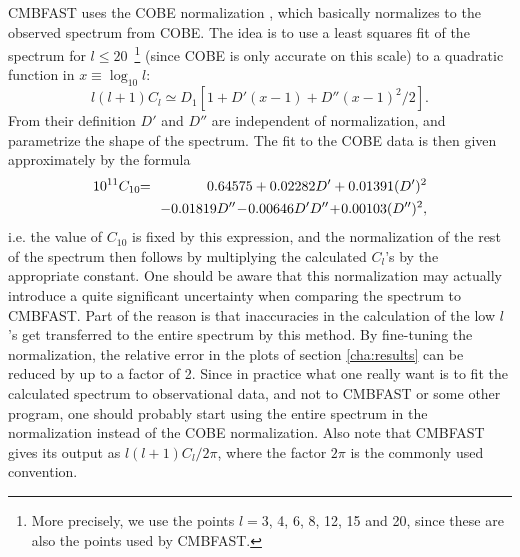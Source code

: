 \documentclass[twocolumn,nofootinbib,amsmath,amssymb]{revtex4}
\newcommand{\be}{\begin{equation}}
\newcommand{\ee}{\end{equation}}
\newcommand{\ba}{\begin{eqnarray}}
\newcommand{\ea}{\end{eqnarray}}
\newcommand{\hs}{\hspace{-1.12mm}}
\newcommand{\eq}{\hs & = & \hs}
\newcommand{\eqnl}{\hs & & \hs}
\begin{document}
CMBFAST uses the COBE normalization \cite{Bunn_White}, which basically
normalizes to the observed spectrum from COBE. The idea is to use a least
squares fit of the spectrum for $l \leq 20$~\footnote{More precisely, we use
the points $l = 3$, 4, 6, 8, 12, 15 and 20, since these are also the points
used by CMBFAST.} (since COBE is only accurate on this scale) to a quadratic
function in $x \equiv \log_{10} l$:
\be
  l(l+1) C_l \simeq D_1 \! \left[ 1 + D'(x-1) + D''(x-1)^2/2 \right] .
\ee
From their definition $D'$ and $D''$ are independent of normalization, and
parametrize the shape of the spectrum. The fit to the COBE data is then given
approximately by the formula~\cite{Bunn_White}
\ba
  10^{11} C_{10} \eq 0.64575 + 0.02282 D' + 0.01391 (D')^2 \\
  \eqnl - 0.01819 D'' \!-\! 0.00646 D' D'' \!+\! 0.00103 (D'')^2 , \nonumber
\ea
i.e. the value of $C_{10}$ is fixed by this expression, and the normalization
of the rest of the spectrum then follows by multiplying the calculated $C_l$'s
by the appropriate constant. One should be aware that this normalization may
actually introduce a quite significant uncertainty when comparing the spectrum
to CMBFAST. Part of the reason is that inaccuracies in the calculation of the
low $l$'s get transferred to the entire spectrum by this method. By fine-tuning
the normalization, the relative error in the plots of section \ref{cha:results}
can be reduced by up to a factor of 2. Since in practice what one really want
is to fit the calculated spectrum to observational data, and not to CMBFAST or
some other program, one should probably start using the entire spectrum in the
normalization instead of the COBE normalization. Also note that CMBFAST gives
its output as $l(l+1) C_l / 2\pi$, where the factor $2\pi$ is the commonly used
convention.


\clearpage
\end{document}
